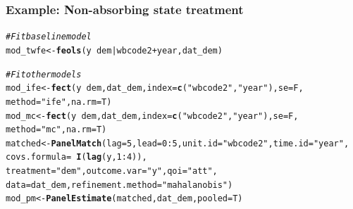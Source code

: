 \documentclass[12pt,aspectratio=169]{beamer}\usepackage[]{graphicx}\usepackage[]{xcolor}
\makeatletter
\newcommand{\hlnum}[1]{\textcolor[rgb]{0.686,0.059,0.569}{#1}}%
\newcommand{\hlstr}[1]{\textcolor[rgb]{0.192,0.494,0.8}{#1}}%
\newcommand{\hlcom}[1]{\textcolor[rgb]{0.678,0.584,0.686}{\textit{#1}}}%
\newcommand{\hlopt}[1]{\textcolor[rgb]{0,0,0}{#1}}%
\newcommand{\hlstd}[1]{\textcolor[rgb]{0.345,0.345,0.345}{#1}}%
\newcommand{\hlkwb}[1]{\textcolor[rgb]{0.69,0.353,0.396}{#1}}%
\newcommand{\hlkwc}[1]{\textcolor[rgb]{0.333,0.667,0.333}{#1}}%
\newcommand{\hlkwd}[1]{\textcolor[rgb]{0.737,0.353,0.396}{\textbf{#1}}}%
\newenvironment{kframe}{%
 \def\at@end@of@kframe{}%
 \ifinner\ifhmode%
  \def\at@end@of@kframe{\end{minipage}}%
  \begin{minipage}{\columnwidth}%
 \fi\fi%
 \def\FrameCommand##1{\hskip\@totalleftmargin \hskip-\fboxsep
 \colorbox{shadecolor}{##1}\hskip-\fboxsep
     \hskip-\linewidth \hskip-\@totalleftmargin \hskip\columnwidth}%
 \MakeFramed {\advance\hsize-\width
   \@totalleftmargin\z@ \linewidth\hsize
   \@setminipage}}%
 {\par\unskip\endMakeFramed%
 \at@end@of@kframe}
\newenvironment{knitrout}{}{} %
\makeatother
\begin{document}
\begin{frame}[fragile]
    \frametitle{Example: Non-absorbing state treatment}
    \scriptsize
    
\begin{knitrout}
\color{fgcolor}\begin{kframe}
\begin{alltt}
\hlcom{# Fit baseline model}
\hlstd{mod_twfe} \hlkwb{<-} \hlkwd{feols}\hlstd{(y} \hlopt{~} \hlstd{dem} \hlopt{|} \hlstd{wbcode2} \hlopt{+} \hlstd{year, dat_dem)}

\hlcom{# Fit other models}
\hlstd{mod_ife} \hlkwb{<-} \hlkwd{fect}\hlstd{(y} \hlopt{~} \hlstd{dem , dat_dem,} \hlkwc{index} \hlstd{=} \hlkwd{c}\hlstd{(}\hlstr{"wbcode2"}\hlstd{,} \hlstr{"year"}\hlstd{),} \hlkwc{se} \hlstd{= F,}
                 \hlkwc{method} \hlstd{=} \hlstr{"ife"}\hlstd{,} \hlkwc{na.rm} \hlstd{= T)}
\hlstd{mod_mc} \hlkwb{<-} \hlkwd{fect}\hlstd{(y} \hlopt{~} \hlstd{dem , dat_dem,} \hlkwc{index} \hlstd{=} \hlkwd{c}\hlstd{(}\hlstr{"wbcode2"}\hlstd{,} \hlstr{"year"}\hlstd{),} \hlkwc{se} \hlstd{= F,}
                 \hlkwc{method} \hlstd{=} \hlstr{"mc"}\hlstd{,} \hlkwc{na.rm} \hlstd{= T)}
\hlstd{matched} \hlkwb{<-} \hlkwd{PanelMatch}\hlstd{(}\hlkwc{lag} \hlstd{=} \hlnum{5}\hlstd{,} \hlkwc{lead} \hlstd{=} \hlnum{0}\hlopt{:}\hlnum{5}\hlstd{,} \hlkwc{unit.id} \hlstd{=} \hlstr{"wbcode2"}\hlstd{,} \hlkwc{time.id} \hlstd{=} \hlstr{"year"}\hlstd{,}
                      \hlkwc{covs.formula} \hlstd{=} \hlopt{~}\hlkwd{I}\hlstd{(}\hlkwd{lag}\hlstd{(y,} \hlnum{1}\hlopt{:}\hlnum{4}\hlstd{)),}
                      \hlkwc{treatment} \hlstd{=} \hlstr{"dem"}\hlstd{,} \hlkwc{outcome.var} \hlstd{=} \hlstr{"y"}\hlstd{,} \hlkwc{qoi} \hlstd{=} \hlstr{"att"}\hlstd{,}
                      \hlkwc{data} \hlstd{= dat_dem,} \hlkwc{refinement.method} \hlstd{=} \hlstr{"mahalanobis"}\hlstd{)}
\hlstd{mod_pm} \hlkwb{<-} \hlkwd{PanelEstimate}\hlstd{(matched, dat_dem,} \hlkwc{pooled} \hlstd{= T)}
\end{alltt}
\end{kframe}
\end{knitrout}
     

\end{frame}
\end{document}
